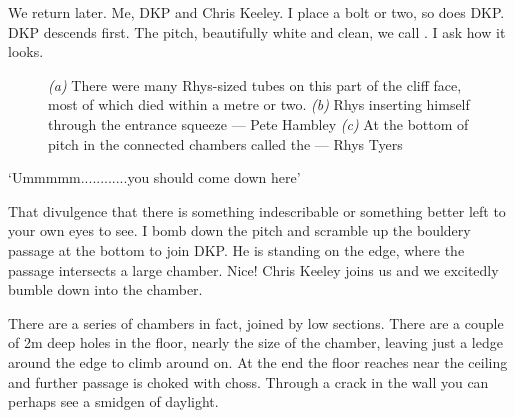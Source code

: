 We return later. Me, DKP and Chris Keeley. I place a bolt or two, so does DKP. DKP descends first. The pitch, beautifully white and clean, we call . I ask how it looks. 

\begin{figure*}[t!]
\checkoddpage \ifoddpage \forcerectofloat \else \forceversofloat \fi
\centering
\begin{subfigure}[t]{0.42\textwidth}
\centering
{}
 \caption{}\label{water chamber below helm's deep}
\end{subfigure}
    \hfill
    \begin{subfigure}[t]{0.56\textwidth}
        \centering
        \caption{} \label{HelmsDeep}
    \end{subfigure}
    
    \vspace{0.3cm}
    \begin{subfigure}[t]{\textwidth}
    \centering
        \caption{} \label{Touching the Void}
    \end{subfigure}
    \caption{
    \emph{(a)} There were many Rhys-sized tubes on this part of the cliff face, most of which died within a metre or two.
    \emph{(b)} Rhys inserting himself through the entrance squeeze --- Pete Hambley
    \emph{(c)} At the bottom of \protect{} pitch in the connected chambers called the \protect{} --- Rhys Tyers}
\end{figure*}

`Ummmmm............you should come down here'
 
 That divulgence that there is something indescribable or something better left to your own eyes to see. I bomb down the pitch and scramble up the bouldery passage at the bottom to join DKP. He is standing on the edge, where the passage intersects  a large chamber. Nice! Chris Keeley joins us and we excitedly bumble down into the chamber.
 
There are a series of chambers in fact, joined by low sections. There are a couple of 2m deep holes in the floor, nearly the size of the chamber, leaving just a ledge around the edge to climb around on. At the end the floor reaches near the ceiling and further passage is choked with choss. Through a crack in the wall you can perhaps see a smidgen of daylight.
 
